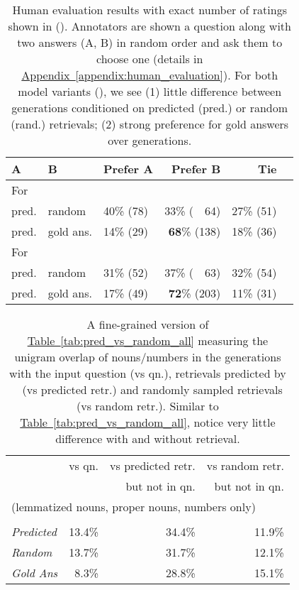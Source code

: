 \documentclass[11pt]{article}
\newcommand{\namedref}[2]{\hyperref[#2]{#1~\ref*{#2}}}
\newcommand{\tableref}[1]{\namedref{Table}{#1}}
\newcommand{\appendixref}[1]{\namedref{Appendix}{#1}}
\newcommand{\retriever}[1]{\textsc{c-REALM}}
\begin{document}
\begin{table}[t]
\small
\begin{center}
\begin{tabular}{ lllrrr } 
 \toprule
A & B &  Prefer A & Prefer B & Tie \\
\midrule
\multicolumn{5}{l}{For }\\
 pred. & random & 40\% (78) & 33\% (~~64) & 27\% (51) \\
 pred. & gold ans. & 14\% (29) & \textbf{68}\% (138) & 18\% (36) \\
 \midrule
\multicolumn{5}{l}{For }\\
  pred. & random & 31\% (52) & 37\% (~~63) & 32\% (54)\\
 pred. & gold ans. & 17\% (49) & \textbf{72}\% (203) & 11\% (31) \\
\bottomrule
\end{tabular}
\end{center}
\caption{Human evaluation results with exact number of ratings shown in (). Annotators are shown a question along with two answers (A, B) in random order and ask them to choose one (details in \appendixref{appendix:human_evaluation}). For both model variants (), we see (1) little difference between generations conditioned on predicted (pred.) or random (rand.) retrievals; (2) strong preference for gold answers over generations. }

\label{tab:human_evaluation}
\end{table}

\begin{table}[t]
\small
\begin{center}
\begin{tabular}{ lrrr } 
 \toprule
  & vs qn. & vs predicted retr. & vs random retr. \\
 & & but not in qn. & but not in qn. \\
\midrule
\multicolumn{4}{l}{(lemmatized nouns, proper nouns, numbers only)} \\\\
\emph{Predicted} & 13.4\% & 34.4\% & 11.9\% \\
\emph{Random} & 13.7\% & 31.7\% & 12.1\% \\
\midrule
\emph{Gold Ans} & 8.3\% & 28.8\% & 15.1\% \\
\bottomrule
\end{tabular}
\end{center}
\caption{A fine-grained version of \tableref{tab:pred_vs_random_all} measuring the unigram overlap of nouns/numbers in the generations with the input question (vs qn.), retrievals predicted by \retriever~ (vs predicted retr.) and randomly sampled retrievals (vs random retr.). Similar to \tableref{tab:pred_vs_random_all}, notice very little difference with and without retrieval.}
\label{tab:pred_vs_random_all_nouns}
\end{table}
\end{document}
